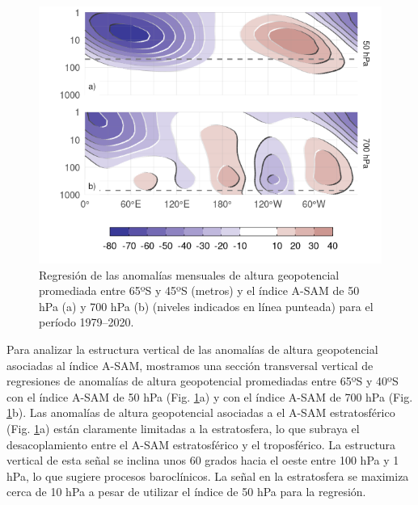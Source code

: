\documentclass[12pt,oneside,a4paper]{reedthesis}
\begin{document}
\begin{figure}

{\centering \includegraphics{figures/30-sam/vertical-regression-1} 

}

\caption{Regresión de las anomalías mensuales de altura geopotencial promediada entre 65ºS y 45ºS (metros) y el índice A-SAM de 50 hPa (a) y 700 hPa (b) (niveles indicados en línea punteada) para el período 1979--2020.}\label{fig:vertical-regression}
\end{figure}

Para analizar la estructura vertical de las anomalías de altura geopotencial asociadas al índice A-SAM, mostramos una sección transversal vertical de regresiones de anomalías de altura geopotencial promediadas entre 65ºS y 40ºS con el índice A-SAM de 50 hPa (Fig. \ref{fig:vertical-regression}a) y con el índice A-SAM de 700 hPa (Fig. \ref{fig:vertical-regression}b).
Las anomalías de altura geopotencial asociadas a el A-SAM estratosférico (Fig. \ref{fig:vertical-regression}a) están claramente limitadas a la estratosfera, lo que subraya el desacoplamiento entre el A-SAM estratosférico y el troposférico.
La estructura vertical de esta señal se inclina unos 60 grados hacia el oeste entre 100 hPa y 1 hPa, lo que sugiere procesos baroclínicos.
La señal en la estratosfera se maximiza cerca de 10 hPa a pesar de utilizar el índice de 50 hPa para la regresión.
\end{document}
